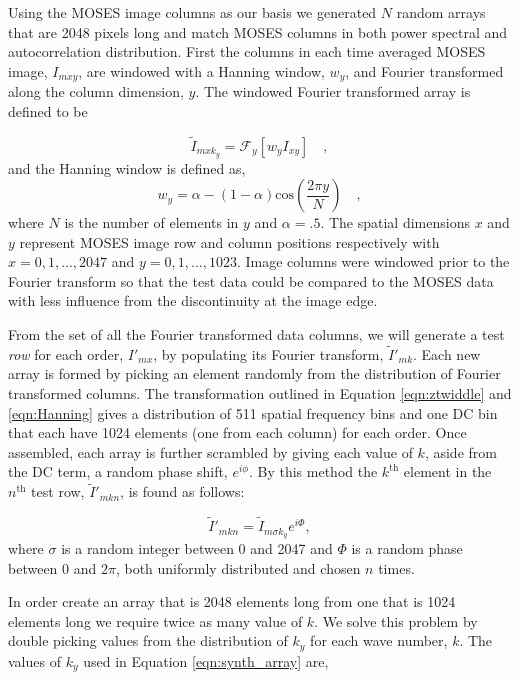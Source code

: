 		Using the MOSES image columns as our basis we generated $N$ random arrays that are 2048 pixels long and match MOSES columns in both power spectral and autocorrelation distribution.  
		First the columns in each time averaged MOSES image, $I_{mxy}$, are windowed with a Hanning window, $w_y$, and Fourier transformed along the column dimension, $y$.  
		The windowed Fourier transformed array is defined to be
	
		\begin{equation}
			\widetilde{I}_{mxk_y} = \mathcal{F}_y\left[ w_yI_{xy}\right]\quad, 
			\label{eqn:ztwiddle}
		\end{equation}
		and the Hanning window is defined as,	
		\begin{equation}
			w_y = \alpha - (1-\alpha)\mathrm{cos}\left( \frac{2\pi y}{N} \right)\quad ,
			\label{eqn:Hanning}
		\end{equation}
		where $N$ is the number of elements in $y$ and $\alpha = .5$.
   		The spatial dimensions $x$ and $y$ represent MOSES image row and column positions respectively with $ x = 0,1,...,2047$ and $y = 0,1,...,1023$.
   		Image columns were windowed prior to the Fourier transform so that the test data could be compared to the MOSES data with less influence from the discontinuity at the image edge.  
	
		From the set of all the Fourier transformed data columns, we will generate a test \emph{row} for each order, $I'_{mx}$, by populating its Fourier transform, $\widetilde{I}'_{mk}$. 
		Each new array is formed by picking an element randomly from the distribution of Fourier transformed columns. 
		The transformation outlined in Equation \ref{eqn:ztwiddle} and \ref{eqn:Hanning} gives a distribution of 511 spatial frequency bins and one DC bin that each have 1024 elements (one from each column) for each order. 
		Once assembled, each array is further scrambled by giving each value of $k$, aside from the DC term, a random phase shift, $e^{i\phi}$.  
		By this method the $k^{\mathrm{th}}$ element in the $n^\text{th}$ test row, $\widetilde{I}'_{mkn}$, is found as follows:
	
		\begin{equation}
			\widetilde{I}'_{mkn} = \widetilde{I}_{m\sigma k_y}e^{i\Phi} ,
			\label{eqn:synth_array}
		\end{equation}
		where $\sigma$ is a random integer between 0 and 2047 and $\Phi$ is a random phase between 0 and $2\pi$, both uniformly distributed and chosen $n$ times.
		
		In order create an array that is 2048 elements long from one that is 1024 elements long we require twice as many value of $k$.  
		We solve this problem by double picking values from the distribution of $k_y$ for each wave number, $k$.  
		The values of $k_y$ used in Equation \ref{eqn:synth_array} are,
		
